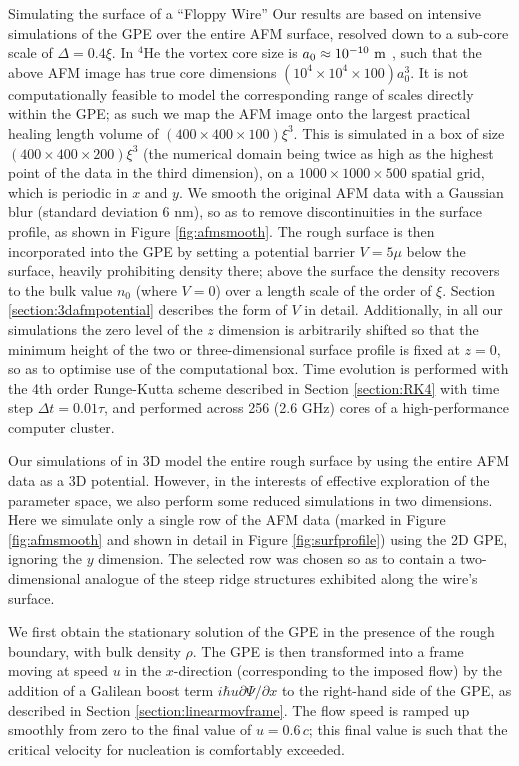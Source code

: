 \begin{chapter}{\label{cha:afm}Simulating the surface of a ``Floppy Wire''}
Our results are based on intensive simulations of the GPE over the entire AFM surface, resolved down to a sub-core scale of $\Delta=0.4\xi$. In $^4$He the vortex core size is $a_0 \approx 10^{-10}~\rm m$ \cite{Rayfield1964}, such that the above AFM image has true core dimensions $(10^4 \times 10^4 \times 100) a_0^3$.  It is not computationally feasible to model the corresponding range of scales directly within the GPE; as such we map the AFM image onto the largest practical healing length volume of $(400 \times 400 \times 100) \xi^3$.  This is simulated in a box of size $(400 \times 400 \times 200) \xi^3$ (the numerical domain being twice as high as the highest point of the data in the third dimension), on a $1000\times 1000\times 500$ spatial grid, which is periodic in $x$ and $y$.  We smooth the original AFM data with a Gaussian blur (standard deviation 6 nm), so as to remove discontinuities in the surface profile, as shown in Figure \ref{fig:afmsmooth}. The rough surface is then incorporated into the GPE by setting a potential barrier $V=5\mu$ below the surface, heavily prohibiting density there; above the surface the density recovers to the bulk value $n_0$ (where $V=0$) over a length scale of the order of $\xi$. Section \ref{section:3dafmpotential} describes the form of $V$ in detail. Additionally, in all our simulations the zero level of the $z$ dimension is arbitrarily shifted so that the minimum height of the two or three-dimensional surface profile is fixed at $z=0$, so as to optimise use of the computational box. Time evolution is performed with the 4th order Runge-Kutta scheme described in Section \ref{section:RK4} with time step $\Delta t=0.01 \tau $, and performed across 256 (2.6 GHz) cores of a high-performance {computer} cluster.

Our simulations of in 3D model the entire rough surface by using the entire AFM data as a 3D potential. However, in the interests of effective exploration of the parameter space, we also perform some reduced simulations in two dimensions. Here we simulate only a single row of the AFM data (marked in Figure \ref{fig:afmsmooth} and shown in detail in Figure \ref{fig:surfprofile}) using the 2D GPE, ignoring the $y$ dimension. The selected row was chosen so as to contain a two-dimensional analogue of the steep ridge structures exhibited along the wire's surface.

We first obtain the stationary solution of the GPE in the presence of
the rough boundary, with bulk density $\rho$.  The GPE is then transformed into a frame moving at speed $u$ in the $x$-direction (corresponding to the imposed flow) by the addition of a Galilean boost term $ i \hbar u \partial \Psi/\partial x$ to the right-hand side of the GPE, as described in Section \ref{section:linearmovframe}.  The flow speed {is}  ramped up smoothly from zero to the final value of $u=0.6\,c$; this final value is such that the critical velocity for nucleation is comfortably exceeded. 


\end{chapter}
